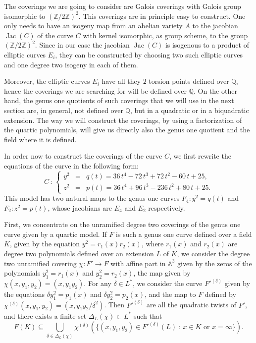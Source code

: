 \documentclass[a4paper,12pt]{amsart}
\theoremstyle{remark}
\theoremstyle{definition}
\begin{document}
The coverings we are going to consider are Galois coverings with
Galois group isomorphic to $({{\mathbb{Z}}}/2{{\mathbb{Z}}})^2$. This coverings are in
principle easy to construct. One only needs to have an isogeny map
from an abelian variety $A$ to the jacobian $\operatorname{Jac}(C)$ of the curve
$C$ with kernel isomorphic, as group scheme, to the group
$({{\mathbb{Z}}}/2{{\mathbb{Z}}})^2$. Since in our case the jacobian $\operatorname{Jac}(C)$ is
isogenous to a product of elliptic curves $E_i$, they can be
constructed by choosing two such elliptic curves and one degree
two isogeny in each of them.

Moreover, the elliptic curves $E_i$ have all they $2$-torsion
points defined over ${{\mathbb{Q}}}$, hence the coverings we are searching
for will be defined over ${{\mathbb{Q}}}$. On the other hand, the genus one
quotients of such coverings that we will use in the next section
are, in general, not defined over ${{\mathbb{Q}}}$, but in a quadratic or in
a biquadratic extension. The way we will construct the coverings,
by using a factorization of the quartic polynomials, will give us
directly also the genus one quotient and the field where it is
defined.

In order now to construct the coverings of the curve $C$, we first
rewrite the equations of the curve in the following form:
$$
C\,:\, \left\{
\begin{array}{rcl}
y^2&\!\!\!=&\!\!\!  q(t)=36\,t^4 - 72\,t^3 + 72\,t^2 - 60\,t + 25,   \\[1mm]
z^2 &\!\!\! =&\!\!\!   p(t)=36\,t^4 + 96\,t^3 - 236\,t^2 + 80\,t +25.
\end{array}\right.
$$
This model has two natural maps to the genus one curves
$F_4:y^2=q(t)$ and $F_2:z^2=p(t)$, whose jacobians are $E_4$ and
$E_2$ respectively.

First, we concentrate on the unramified degree two coverings of
the genus one curve given by a quartic model. If $F$ is such a
genus one curve defined over a field $K$, given by the equation
$y^2=r_1(x)r_2(x)$, where $r_1(x)$ and $r_2(x)$ are degree two
polynomials defined over an extension $L$ of $K$, we consider the
degree two unramified covering $\chi:F'\to F$ with affine part in
${{\mathbb{A}}}^3$ given by the zeros of the polynomials $y_1^2=r_1(x)$ and
$y_2^2=r_2(x)$, the map given by $\chi(x,y_1,y_2)=(x,y_1y_2)$.
For any $\delta \in L^*$, we consider the curve $F'^{(\delta)}$
given by the equations $\delta y_1^2=p_1(x)$ and $\delta
y_2^2=p_2(x)$, and the map to $F$ defined by
$\chi^{(\delta)}(x,y_1,y_2)=(x,y_1y_2/\delta^2)$. Then
$F'^{(\delta)}$ are all the quadratic twists of $F'$, and there
exists a finite set $\Delta_L(\chi)\subset L^*$ such that
$$F(K) \subseteq \bigcup_{\delta \in \Delta_L(\chi)} \chi^{(\delta)}(\{(x,y_1,y_2)\in F'^{(\delta)}(L)\ : \ x\in K  \mbox{ or } x=\infty \}).$$
\end{document}
